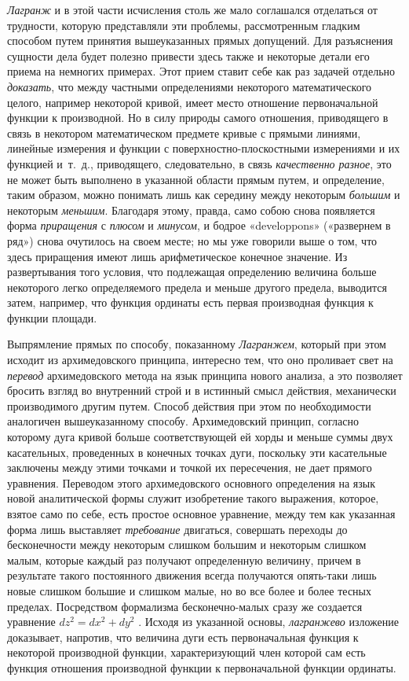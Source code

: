 {\em Лагранж} и в этой части исчисления столь же мало
соглашался отделаться от трудности, которую представляли эти проблемы,
рассмотренным гладким способом путем принятия вышеуказанных прямых
допущений. Для разъяснения сущности дела будет полезно привести здесь также
и некоторые детали его приема на немногих примерах. Этот прием ставит себе
как раз задачей отдельно {\em доказать}, что между
частными определениями некоторого математического целого, например
некоторой кривой, имеет место отношение первоначальной функции к
производной. Но в силу природы самого отношения, приводящего в связь в
некотором математическом предмете кривые с прямыми линиями, линейные
измерения и функции с поверхностно-плоскостными измерениями и их функцией
и~т.~д., приводящего, следовательно, в связь
{\em качественно разное}, это не может быть выполнено в
указанной области прямым путем, и определение, таким образом, можно
понимать лишь как середину между некоторым
{\em большим} и некоторым
{\em меньшим}. Благодаря этому, правда, само собою
снова появляется форма {\em приращения} с
{\em плюсом} и {\em минусом}, и
бодрое «developpons» («развернем в ряд») снова очутилось на своем месте; но
мы уже говорили выше о том, что здесь приращения имеют лишь арифметическое
конечное значение. Из развертывания того условия, что подлежащая
определению величина больше некоторого легко определяемого предела и меньше
другого предела, выводится затем, например, что функция ординаты есть
первая производная функция к функции площади.

Выпрямление прямых по способу, показанному
{\em Лагранжем}, который при этом исходит из
архимедовского принципа, интересно тем, что оно проливает свет на
{\em перевод} архимедовского метода на язык принципа
нового анализа, а это позволяет бросить взгляд во внутренний строй и в
истинный смысл действия, механически производимого другим путем. Способ
действия при этом по необходимости аналогичен вышеуказанному способу.
Архимедовский принцип, согласно которому дуга кривой больше соответствующей
ей хорды и меньше суммы двух касательных, проведенных в конечных точках
дуги, поскольку эти касательные заключены между этими точками и точкой их
пересечения, не дает прямого уравнения. Переводом этого архимедовского
основного определения на язык новой аналитической формы служит изобретение
такого выражения, которое, взятое само по себе, есть простое основное
уравнение, между тем как указанная форма лишь выставляет
{\em требование} двигаться, совершать переходы до
бесконечности между некоторым слишком большим и некоторым слишком малым,
которые каждый раз получают определенную величину, причем в результате
такого постоянного движения всегда получаются опять-таки лишь новые слишком
большие и слишком малые, но во все более и более тесных пределах.
Посредством формализма бесконечно-малых сразу же создается уравнение 
$dz^2=dx^2+dy^2$ . Исходя из указанной основы,
{\em лагранжево} изложение доказывает, напротив, что
величина дуги есть первоначальная функция к некоторой производной функции,
характеризующий член которой сам есть функция отношения производной функции
к первоначальной функции ординаты.


